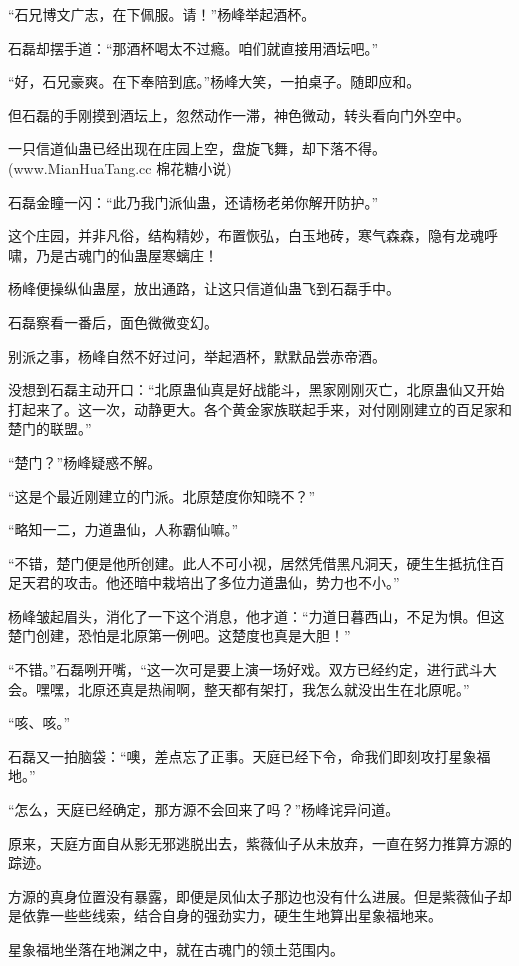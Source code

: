 \begin{this_body}
“石兄博文广志，在下佩服。请！”杨峰举起酒杯。

石磊却摆手道：“那酒杯喝太不过瘾。咱们就直接用酒坛吧。”

“好，石兄豪爽。在下奉陪到底。”杨峰大笑，一拍桌子。随即应和。

但石磊的手刚摸到酒坛上，忽然动作一滞，神色微动，转头看向门外空中。

一只信道仙蛊已经出现在庄园上空，盘旋飞舞，却下落不得。(www.MianHuaTang.cc 棉花糖小说)

石磊金瞳一闪：“此乃我门派仙蛊，还请杨老弟你解开防护。”

这个庄园，并非凡俗，结构精妙，布置恢弘，白玉地砖，寒气森森，隐有龙魂呼啸，乃是古魂门的仙蛊屋寒螭庄！

杨峰便操纵仙蛊屋，放出通路，让这只信道仙蛊飞到石磊手中。

石磊察看一番后，面色微微变幻。

别派之事，杨峰自然不好过问，举起酒杯，默默品尝赤帝酒。

没想到石磊主动开口：“北原蛊仙真是好战能斗，黑家刚刚灭亡，北原蛊仙又开始打起来了。这一次，动静更大。各个黄金家族联起手来，对付刚刚建立的百足家和楚门的联盟。”

“楚门？”杨峰疑惑不解。

“这是个最近刚建立的门派。北原楚度你知晓不？”

“略知一二，力道蛊仙，人称霸仙嘛。”

“不错，楚门便是他所创建。此人不可小视，居然凭借黑凡洞天，硬生生抵抗住百足天君的攻击。他还暗中栽培出了多位力道蛊仙，势力也不小。”

杨峰皱起眉头，消化了一下这个消息，他才道：“力道日暮西山，不足为惧。但这楚门创建，恐怕是北原第一例吧。这楚度也真是大胆！”

“不错。”石磊咧开嘴，“这一次可是要上演一场好戏。双方已经约定，进行武斗大会。嘿嘿，北原还真是热闹啊，整天都有架打，我怎么就没出生在北原呢。”

“咳、咳。”

石磊又一拍脑袋：“噢，差点忘了正事。天庭已经下令，命我们即刻攻打星象福地。”

“怎么，天庭已经确定，那方源不会回来了吗？”杨峰诧异问道。

原来，天庭方面自从影无邪逃脱出去，紫薇仙子从未放弃，一直在努力推算方源的踪迹。

方源的真身位置没有暴露，即便是凤仙太子那边也没有什么进展。但是紫薇仙子却是依靠一些些线索，结合自身的强劲实力，硬生生地算出星象福地来。

星象福地坐落在地渊之中，就在古魂门的领土范围内。


\end{this_body}

